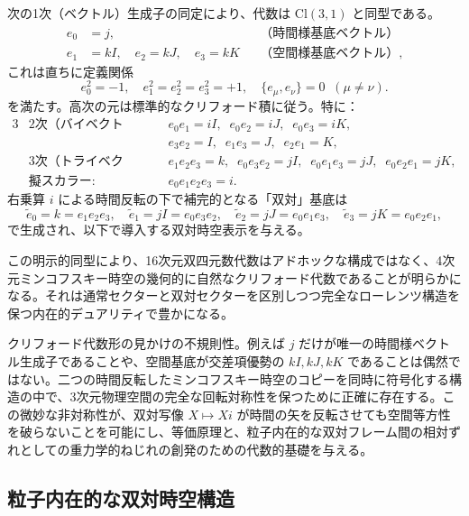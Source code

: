 \documentclass[dvipdfmx,a4paper]{article}
\begin{document}
次の1次（ベクトル）生成子の同定により、代数は $\mathrm{Cl}(3,1)$ と同型である。
\begin{align*}
  e_0 &= j,                    & &\text{（時間様基底ベクトル）}\\[4pt]
  e_1 &= kI, \quad e_2 = kJ, \quad e_3 = kK & &\text{（空間様基底ベクトル）},
\end{align*}
これは直ちに定義関係
\[
e_0^2 = -1, \quad e_1^2 = e_2^2 = e_3^2 = +1, \quad \{e_\mu,e_\nu\} = 0 \;\; (\mu \neq \nu).
\]
を満たす。高次の元は標準的なクリフォード積に従う。特に：
\begin{alignat*}{3}
  &\text{2次（バイベクトル）:}  &\quad& e_0e_1 = iI, \;\; e_0e_2 = iJ, \;\; e_0e_3 = iK, \\
  &&& e_3e_2 = I,   \;\; e_1e_3 = J,   \;\; e_2e_1 = K, \\[6pt]
  &\text{3次（トライベクトル）:} && e_1e_2e_3 = k, \;\; e_0e_3e_2 = jI, \;\; e_0e_1e_3 = jJ, \;\; e_0e_2e_1 = jK, \\[6pt]
  &\text{擬スカラー:}        && e_0e_1e_2e_3 = i.
\end{alignat*}
右乗算 $i$ による時間反転の下で補完的となる「双対」基底は
\[
\tilde{e}_0 = k = e_1e_2e_3, \quad \tilde{e}_1 = jI = e_0e_3e_2, \quad \tilde{e}_2 = jJ = e_0e_1e_3, \quad \tilde{e}_3 = jK = e_0e_2e_1,
\]
で生成され、以下で導入する双対時空表示を与える。

この明示的同型により、16次元双四元数代数はアドホックな構成ではなく、4次元ミンコフスキー時空の幾何的に自然なクリフォード代数であることが明らかになる。それは通常セクターと双対セクターを区別しつつ完全なローレンツ構造を保つ内在的デュアリティで豊かになる。

クリフォード代数形の見かけの不規則性。例えば $j$ だけが唯一の時間様ベクトル生成子であることや、空間基底が交差項優勢の $kI,kJ,kK$ であることは偶然ではない。二つの時間反転したミンコフスキー時空のコピーを同時に符号化する構造の中で、3次元物理空間の完全な回転対称性を保つために正確に存在する。この微妙な非対称性が、双対写像 $X \mapsto Xi$ が時間の矢を反転させても空間等方性を破らないことを可能にし、等価原理と、粒子内在的な双対フレーム間の相対ずれとしての重力学的ねじれの創発のための代数的基礎を与える。

\subsection{粒子内在的な双対時空構造}
\end{document}
